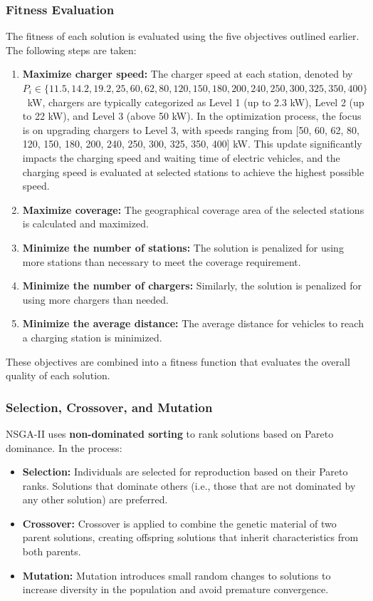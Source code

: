 \subsubsection{Fitness Evaluation}
The fitness of each solution is evaluated using the five objectives outlined earlier. The following steps are taken:
\begin{enumerate}
    \item \textbf{Maximize charger speed:} The charger speed at each station, denoted by $P_i \in \{11.5, 14.2, 19.2, 25, 60, 62, 80, 120, 150, 180, 200, 240, 250, 300, 325, 350, 400\}$~kW, chargers are typically categorized as Level 1 (up to 2.3 kW), Level 2 (up to 22 kW), and Level 3 (above 50 kW). In the optimization process, the focus is on upgrading chargers to Level 3, with speeds ranging from [50, 60, 62, 80, 120, 150, 180, 200, 240, 250, 300, 325, 350, 400] kW. This update significantly impacts the charging speed and waiting time of electric vehicles, and the charging speed is evaluated at selected stations to achieve the highest possible speed.
    
    \item \textbf{Maximize coverage:} The geographical coverage area of the selected stations is calculated and maximized.   
    
    \item \textbf{Minimize the number of stations:} The solution is penalized for using more stations than necessary to meet the coverage requirement.
    \item \textbf{Minimize the number of chargers:} Similarly, the solution is penalized for using more chargers than needed.
    \item \textbf{Minimize the average distance:} The average distance for vehicles to reach a charging station is minimized.
\end{enumerate}

These objectives are combined into a fitness function that evaluates the overall quality of each solution.

\subsubsection{Selection, Crossover, and Mutation}
NSGA-II uses \textbf{non-dominated sorting} to rank solutions based on Pareto dominance. In the process:
\begin{itemize}
    \item \textbf{Selection:} Individuals are selected for reproduction based on their Pareto ranks. Solutions that dominate others (i.e., those that are not dominated by any other solution) are preferred.
    \item \textbf{Crossover:} Crossover is applied to combine the genetic material of two parent solutions, creating offspring solutions that inherit characteristics from both parents.
    \item \textbf{Mutation:} Mutation introduces small random changes to solutions to increase diversity in the population and avoid premature convergence.
\end{itemize}

